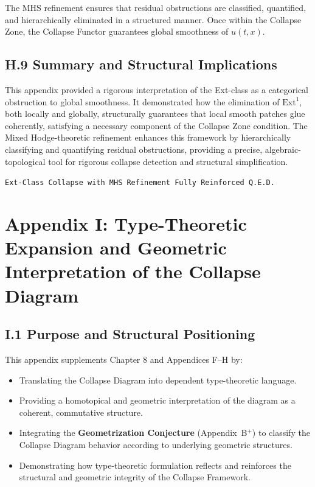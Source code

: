 \documentclass[11pt]{article}
\begin{document}
The MHS refinement ensures that residual obstructions are classified, quantified, and hierarchically eliminated in a structured manner.  
Once within the Collapse Zone, the Collapse Functor guarantees global smoothness of \( u(t, x) \).

\subsection*{H.9 Summary and Structural Implications}

This appendix provided a rigorous interpretation of the Ext-class as a categorical obstruction to global smoothness.  
It demonstrated how the elimination of \( \mathrm{Ext}^1 \), both locally and globally, structurally guarantees that local smooth patches glue coherently, satisfying a necessary component of the Collapse Zone condition.  
The Mixed Hodge-theoretic refinement enhances this framework by hierarchically classifying and quantifying residual obstructions, providing a precise, algebraic-topological tool for rigorous collapse detection and structural simplification.

\begin{flushright}
\texttt{Ext-Class Collapse with MHS Refinement \quad Fully Reinforced \quad Q.E.D.}
\end{flushright}



\section*{Appendix I: Type-Theoretic Expansion and Geometric Interpretation of the Collapse Diagram}

\subsection*{I.1 Purpose and Structural Positioning}

This appendix supplements Chapter 8 and Appendices F–H by:

\begin{itemize}
  \item Translating the Collapse Diagram into dependent type-theoretic language.
  \item Providing a homotopical and geometric interpretation of the diagram as a coherent, commutative structure.
  \item Integrating the \textbf{Geometrization Conjecture} (Appendix~B$^+$) to classify the Collapse Diagram behavior according to underlying geometric structures.
  \item Demonstrating how type-theoretic formulation reflects and reinforces the structural and geometric integrity of the Collapse Framework.
\end{itemize}
\end{document}
